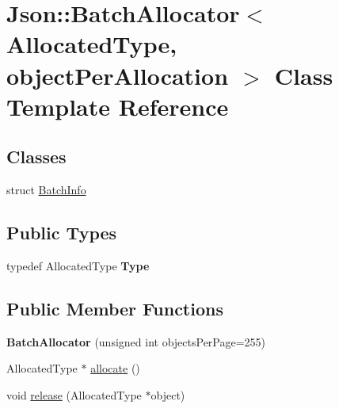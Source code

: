 \hypertarget{class_json_1_1_batch_allocator}{\section{Json\-:\-:Batch\-Allocator$<$ Allocated\-Type, object\-Per\-Allocation $>$ Class Template Reference}
\label{class_json_1_1_batch_allocator}
}
\subsection*{Classes}
\begin{DoxyCompactItemize}
\item 
struct \hyperlink{struct_json_1_1_batch_allocator_1_1_batch_info}{Batch\-Info}
\end{DoxyCompactItemize}
\subsection*{Public Types}
\begin{DoxyCompactItemize}
\item 
\hypertarget{class_json_1_1_batch_allocator_a031e753885fcb007c20511e15f84d1a4}{typedef Allocated\-Type {\bfseries Type}}\label{class_json_1_1_batch_allocator_a031e753885fcb007c20511e15f84d1a4}

\end{DoxyCompactItemize}
\subsection*{Public Member Functions}
\begin{DoxyCompactItemize}
\item 
\hypertarget{class_json_1_1_batch_allocator_a96aae4d9032847b074e72a0cf32bc9ea}{{\bfseries Batch\-Allocator} (unsigned int objects\-Per\-Page=255)}\label{class_json_1_1_batch_allocator_a96aae4d9032847b074e72a0cf32bc9ea}

\item 
Allocated\-Type $\ast$ \hyperlink{class_json_1_1_batch_allocator_a4909756c2d33bd0f07662e88e4f850dd}{allocate} ()
\item 
void \hyperlink{class_json_1_1_batch_allocator_aceb116aceb6bb5bbcfd05433abc04ba5}{release} (Allocated\-Type $\ast$object)
\end{DoxyCompactItemize}

